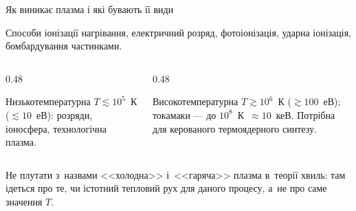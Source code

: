 \documentclass[]{beamer}
\begin{document}
\begin{frame}{Як виникає плазма і які бувають її види}
	\begin{block}{Способи іонізації}\justifying\small
		нагрівання, електричний розряд, фотоіонізація, ударна іонізація, бомбардування частинками.
	\end{block}
	\begin{columns}[T]
		\begin{column}{0.48\linewidth}
			\begin{block}{Низькотемпературна}\small
				$T\lesssim10^5$~К ($\lesssim10$~еВ): розряди, іоносфера, технологічна плазма.
			\end{block}
		\end{column}
		\begin{column}{0.48\linewidth}
			\begin{block}{Високотемпературна}\small
				$T\gtrsim10^6$~К ($\gtrsim100$~еВ); токамаки --- до $10^8$~К~$\approx10$~кеВ. Потрібна для
				\alert{керованого термоядерного синтезу}.
			\end{block}
		\end{column}
	\end{columns}
	\begin{alertblock}{}\justifying\small
		Не плутати з~назвами <<холодна>> і~<<гаряча>> плазма в~теорії хвиль: там ідеться про те, чи істотний
		тепловий рух для даного процесу, а~не про саме значення $T$.
	\end{alertblock}
\end{frame}
\end{document}
